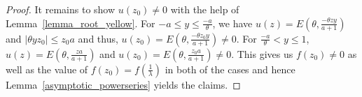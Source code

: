 \documentclass[10pt,a4paper]{amsart}
\begin{document}
\begin{proof}
It remains to show $u(z_0)\neq 0$ with the help of Lemma~\ref{lemma_root_yellow}. For  $-a\leq y \leq \frac{-a}{\theta}$, we have $u(z)= E\left(\theta,\frac{-\theta zy}{a+1}\right)$ and $|\theta yz_0|\le z_0 a$ and thus,
$u(z_0)= E\left(\theta,\frac{-\theta z_0y}{a+1}\right)\neq 0$. %
  For $\frac{-a}{\theta}<y\leq1$, 
  $u(z)= E\left(\theta,\frac{za}{a+1}\right)$ and
      $u(z_0)= E\left(\theta,\frac{z_0a}{a+1}\right)%
      \neq 0$.
   This gives us $f(z_0)\neq 0$ as well as the value of $f(z_0)=f(\frac{1}{\lambda})$ in both of the cases and hence Lemma~\ref{asymptotic_powerseries} yields the claims. 

\end{proof}
\end{document}
